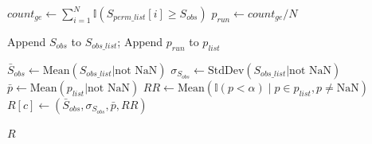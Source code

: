 \begin{algorithm}[H]
\begin{algorithmic}[1]
    \State $count_{ge} \leftarrow \sum_{i=1}^{N} \mathbb{I}(S_{perm\_list}[i] \ge S_{obs})$
    \State $p_{run} \leftarrow count_{ge} / N$ 
    \medskip

    \State Append $S_{obs}$ to $S_{obs\_list}$; Append $p_{run}$ to $p_{list}$ 
    \EndFor {}
    \medskip

    \State $\bar{S}_{obs} \leftarrow \text{Mean}(S_{obs\_list} | \text{not NaN})$ 
    \State $\sigma_{S_{obs}} \leftarrow \text{StdDev}(S_{obs\_list} | \text{not NaN})$ 
    \State $\bar{p} \leftarrow \text{Mean}(p_{list} | \text{not NaN})$ 
    \State $RR \leftarrow \text{Mean}(\mathbb{I}(p < \alpha) \mid p \in p_{list}, p \neq \text{NaN})$ 
    \State $R[c] \leftarrow (\bar{S}_{obs}, \sigma_{S_{obs}}, \bar{p}, RR)$ 
    \medskip
    \EndFor {}

    \State \Return $R$

  \end{algorithmic}
\end{algorithm}

